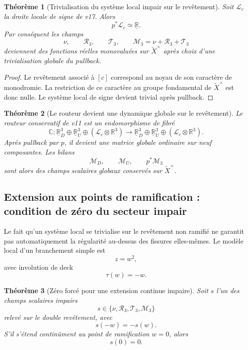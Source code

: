 \documentclass[11pt,a4paper]{article}
\newtheorem{theorem}{Théorème}[section]
\begin{document}
\begin{theorem}[Trivialisation du système local impair sur le revêtement]\label{thm:v18-pullback-trivial}
Soit $\mathcal L_c$ la droite locale de signe de v17. Alors
\begin{equation}\label{eq:v18-pullback-trivial}
 \boxed{p^*\mathcal L_c\simeq\underline{\mathbb R}.}
\end{equation}
Par conséquent les champs
\[
 \nu,\qquad \mathscr R_3,\qquad \mathscr T_3,\qquad
 \mathcal M_3=\nu+\mathscr R_3+\mathscr T_3
\]
deviennent des fonctions réelles monovaluées sur $\widetilde X^\times$ après choix d'une trivialisation globale du pullback.
\end{theorem}

\begin{proof}
Le revêtement associé à $[c]$ correspond au noyau de son caractère de monodromie. La restriction de ce caractère au groupe fondamental de $\widetilde X^\times$ est donc nulle. Le système local de signe devient trivial après pullback.
\end{proof}

\begin{theorem}[Le routeur devient une dynamique globale sur le revêtement]\label{thm:v18-global-router}
Le routeur conservatif de v11 est un endomorphisme de fibré
\[
 \mathbb C:
 \underline{\mathbb R}^{3}_D
 \oplus\underline{\mathbb R}^{3}_U
 \oplus(\mathcal L_c\otimes\mathbb R^3)
 \longrightarrow
 \underline{\mathbb R}^{3}_D
 \oplus\underline{\mathbb R}^{3}_U
 \oplus(\mathcal L_c\otimes\mathbb R^3).
\]
Après pullback par $p$, il devient une matrice globale ordinaire sur neuf composantes. Les bilans
\[
 \mathcal M_D,\qquad\mathcal M_U,\qquad p^*\mathcal M_3
\]
sont alors des champs scalaires globaux conservés sur $\widetilde X^\times$.
\end{theorem}

\subsection{Extension aux points de ramification : condition de zéro du secteur impair}

Le fait qu'un système local se trivialise sur le revêtement non ramifié ne garantit pas automatiquement la régularité au-dessus des fissures elles-mêmes. Le modèle local d'un branchement simple est
\[
 z=w^2,
\]
avec involution de deck
\[
 \tau(w)=-w.
\]

\begin{theorem}[Zéro forcé pour une extension continue impaire]\label{thm:v18-odd-zero}
Soit $s$ l'un des champs scalaires impairs
\[
 s\in\{\nu,\mathscr R_3,\mathscr T_3,\mathcal M_3\}
\]
relevé sur le double revêtement, avec
\[
 s(-w)=-s(w).
\]
S'il s'étend continûment au point de ramification $w=0$, alors
\begin{equation}\label{eq:v18-odd-zero}
 \boxed{s(0)=0.}
\end{equation}
\end{theorem}
\end{document}

